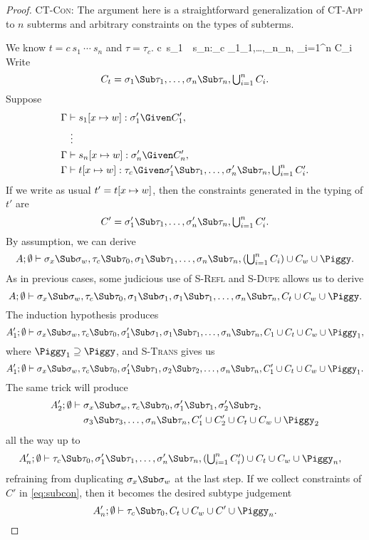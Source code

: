 \documentclass{amsart}
\theoremstyle{definition}
\begin{document}
\begin{proof}
\Case\textsc{CT-Con}: The argument here is a straightforward
generalization of \hbox{\textsc{CT-App}} to $n$ subterms and
arbitrary constraints on the types of subterms.

We know $t=c~s_1~\cdots~s_n$ and $\tau=\tau_c$.
%
{\Gamma\vdash c~s_1~\cdots~s_n:\tau_c\Given
\sigma_1\Sub\tau_1,\ldots,\sigma_n\Sub\tau_n,
{\textstyle\bigcup_{i=1}^n C_i}
}
%
Write
\[
C_t=\sigma_1\Sub\tau_1,\ldots,\sigma_n\Sub\tau_n,
{\textstyle\bigcup_{i=1}^n C_i}.
\]
Suppose
\begin{align*}
\Gamma&\vdash s_1[x\mapsto \Xdef]:\sigma_1'\Given C_1',\\
&~\vdots\\
\Gamma&\vdash s_n[x\mapsto \Xdef]:\sigma_n'\Given C_n',\\
\Gamma&\vdash t[x\mapsto \Xdef]:\tau_c\Given
\sigma_1'\Sub\tau_1,\ldots,\sigma_n'\Sub\tau_n,
{\textstyle\bigcup_{i=1}^n C_i'}.
\end{align*}
If we write as usual $t'=t[x\mapsto w]$, then the constraints
generated in the typing of $t'$ are
\[
C'=\sigma_1'\Sub\tau_1,\ldots,\sigma_n'\Sub\tau_n,
{\textstyle\bigcup_{i=1}^n C_i'}.
\]
By assumption, we can derive
\[
A;\Exigent\vdash \sigma_x\Sub\sigma_\Xdef,\tau_c\Sub\tau_0,
\sigma_1\Sub\tau_1,\ldots,\sigma_n\Sub\tau_n,
({\textstyle\bigcup_{i=1}^n C_i})
\cup C_\Xdef\cup\Piggy.
\]
As in previous cases, some judicious use of \textsc{S-Refl} and
\textsc{S-Dupe} allows us to derive
\[
A;\Exigent\vdash \sigma_x\Sub\sigma_\Xdef,\tau_c\Sub\tau_0,
\sigma_1\Sub\sigma_1,
\sigma_1\Sub\tau_1,\ldots,\sigma_n\Sub\tau_n,
C_t\cup C_\Xdef\cup\Piggy.
\]
The induction hypothesis produces
\[
A_1';\Exigent\vdash \sigma_x\Sub\sigma_\Xdef,\tau_c\Sub\tau_0,
\sigma_1'\Sub\sigma_1,
\sigma_1\Sub\tau_1,\ldots,\sigma_n\Sub\tau_n,
C_1\cup C_t\cup C_\Xdef\cup\Piggy_1,
\]
where $\Piggy_1\supseteq\Piggy$, and \textsc{S-Trans} gives us
\[
A_1';\Exigent\vdash \sigma_x\Sub\sigma_\Xdef,\tau_c\Sub\tau_0,
\sigma_1'\Sub\tau_1,
\sigma_2\Sub\tau_2,\ldots,\sigma_n\Sub\tau_n,
C_1'\cup
C_t\cup C_\Xdef\cup
\Piggy_1.
\]
The same trick will produce
\begin{align*}
A_2';\Exigent\vdash\;& \sigma_x\Sub\sigma_\Xdef,\tau_c\Sub\tau_0,
\sigma_1'\Sub\tau_1,
\sigma_2'\Sub\tau_2,\\
&\sigma_3\Sub\tau_3,
\ldots,\sigma_n\Sub\tau_n,
C_1'\cup C_2'\cup
C_t\cup C_\Xdef\cup\Piggy_2
\end{align*}
all the way up to
\begin{align}
A_n';\Exigent&\vdash \tau_c\Sub\tau_0,
\sigma_1'\Sub\tau_1,\ldots,\sigma_n'\Sub\tau_n,
({\textstyle\bigcup_{i=1}^nC_i'})\cup
C_t\cup C_\Xdef\cup\Piggy_n,
\label{eq:subcon}
\end{align}
refraining from duplicating $\sigma_x\Sub\sigma_\Xdef$ at the last
step. If we collect constraints of $C'$ in \eqref{eq:subcon},
then it becomes the desired subtype judgement
\[
A_n';\Exigent\vdash \tau_c\Sub\tau_0,
C_t\cup C_\Xdef\cup C'\cup\Piggy_n.
\]


\end{proof}
\end{document}

